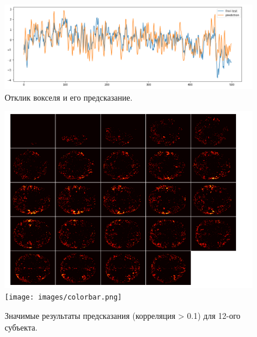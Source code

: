 \documentclass[pdftex,ptm,12pt,a4paper]{report}
\theoremstyle{definition}
\begin{document}
\begin{figure}[h]
\includegraphics[scale=0.5]{graphics/sub3_prep2_bestvoxel.png}
\centering
\caption{Отклик вокселя и его предсказание.}
\label{sub3_bv}
\end{figure}

\begin{figure}[h]
\includegraphics[scale=0.65]{graphics/sub12_trunk01.png}
\texttt{[image: images/colorbar.png]}
\centering
\caption{Значимые результаты предсказания (корреляция > 0.1) для 12-ого субъекта.}
\label{sub12_mosaic}
\end{figure}
\end{document}
